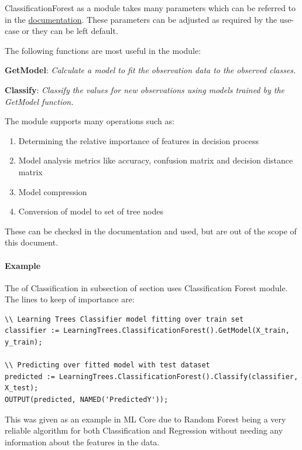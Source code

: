 \documentclass[a4paper,oneside,12pt]{book}
\begin{document}
ClassificationForest as a module takes many parameters which can be referred to in the \href{https://cdn.hpccsystems.com/pdf/ml/LearningTrees.pdf}{documentation}. These parameters can be adjusted as required by the use-case or they can be left default. 

The following functions are most useful in the module:

\textbf{GetModel}: \textit{Calculate a model to fit the observation data to the observed classes.}

\textbf{Classify}: \textit{Classify the values for new observations using models trained by the GetModel function.}

The module supports many operations such as: 

\begin{enumerate}
    \item Determining the relative importance of features in decision process
    \item Model analysis metrics like accuracy, confusion matrix and decision distance matrix
    \item Model compression
    \item Conversion of model to set of tree nodes
\end{enumerate}

These can be checked in the documentation and used, but are out of the scope of this document.

\paragraph{Example}

The  of Classification in  subsection of section  uses Classification Forest module. The lines to keep of importance are:

\begin{lstlisting}
\\ Learning Trees Classifier model fitting over train set
classifier := LearningTrees.ClassificationForest().GetModel(X_train, y_train);

\\ Predicting over fitted model with test dataset
predicted := LearningTrees.ClassificationForest().Classify(classifier, X_test);
OUTPUT(predicted, NAMED('PredictedY'));
\end{lstlisting}

This was given as an example in ML Core due to Random Forest being a very reliable algorithm for both Classification and Regression without needing any information about the features in the data.
\end{document}
